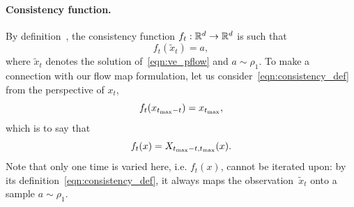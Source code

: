 \paragraph{Consistency function.}
By definition~\citep{song_consistency_2023}, the consistency function $f_t: \mathbb{R}^d \to \mathbb{R}^d $ is such that
\begin{equation}
	\label{eqn:consistency_def}
	f_t(\tilde x_t) = a,
\end{equation}
where $\tilde x_t$ denotes the solution of~\eqref{eqn:ve_pflow} and $a\sim\rho_1$.
%
To make a connection with our flow map formulation, let us consider~\eqref{eqn:consistency_def} from the perspective of $x_t$,
\begin{equation}
	\label{eqn:consistency_def_tilde}
	f_t(x_{t_{\max}-t})= x_{t_{\max}},
\end{equation}
which is to say that
\begin{equation}
	\label{eqn:consistency_flow_map}
	f_t(x) = X_{t_{\max}-t, t_{\max}}(x).
\end{equation}
Note that only one time is varied here, i.e. $f_t(x)$, cannot be iterated upon: by its definition~\eqref{eqn:consistency_def}, it always maps the observation~$\tilde x_t$ onto a sample $a\sim\rho_1$.

